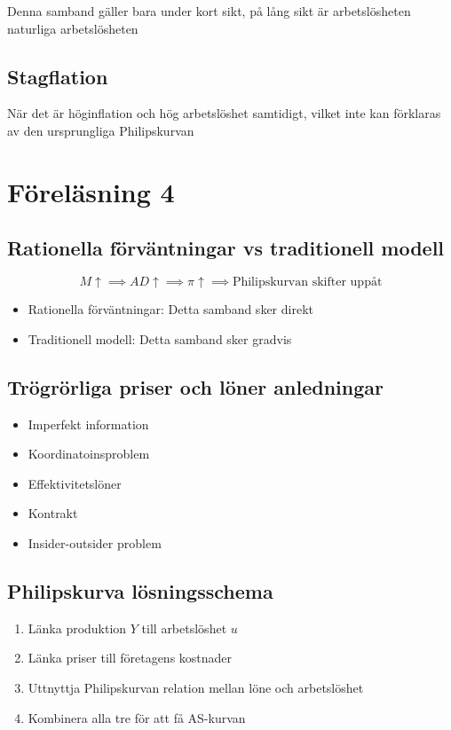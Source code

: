 \documentclass[12pt,a4paper]{article}
\begin{document}
\noindent Denna samband gäller bara under kort sikt, på lång sikt är arbetslösheten naturliga arbetslösheten

\subsection*{Stagflation}
När det är höginflation och hög arbetslöshet samtidigt, vilket inte kan förklaras av den ursprungliga Philipskurvan
\newpage
\section*{Föreläsning 4}
\subsection*{Rationella förväntningar vs traditionell modell}
$$M \uparrow \implies AD \uparrow \implies \pi \uparrow \implies \text{Philipskurvan skifter uppåt}$$
\begin{itemize}
    \item Rationella förväntningar: Detta samband sker direkt
    \item Traditionell modell: Detta samband sker gradvis
\end{itemize}

\subsection*{Trögrörliga priser och löner anledningar}
\begin{itemize}
    \item Imperfekt information
    \item Koordinatoinsproblem 
    \item Effektivitetslöner
    \item Kontrakt 
    \item Insider-outsider problem
\end{itemize}

\subsection*{Philipskurva lösningsschema}
\begin{enumerate}
    \item Länka produktion $Y$ till arbetslöshet $u$
    \item Länka priser till företagens kostnader 
    \item Uttnyttja Philipskurvan relation mellan löne och arbetslöshet
    \item Kombinera alla tre för att få AS-kurvan
\end{enumerate}
\end{document}
